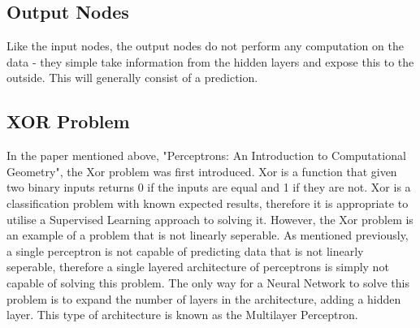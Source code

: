 \documentclass[12pt]{report}
\begin{document}
\subsection{Output Nodes}
\begin{flushleft}
Like the input nodes, the output nodes do not perform any computation on the data - they simple take information from the hidden layers and expose this to the outside. This will generally consist of a prediction.
\end{flushleft}

\subsection{XOR Problem}
\begin{flushleft}
In the paper mentioned above, "Perceptrons: An Introduction to Computational Geometry", the Xor problem was first introduced. Xor is a function that given two binary inputs returns 0 if the inputs are equal and 1 if they are not. Xor is a classification problem with known expected results, therefore it is appropriate to utilise a Supervised Learning approach to solving it. However, the Xor problem is an example of a problem that is not linearly seperable. As mentioned previously, a single perceptron is not capable of predicting data that is not linearly seperable, therefore a single layered architecture of perceptrons is simply not capable of solving this problem. The only way for a Neural Network to solve this problem is to expand the number of layers in the architecture, adding a hidden layer. This type of architecture is known as the Multilayer Perceptron.
\end{flushleft}
\end{document}
